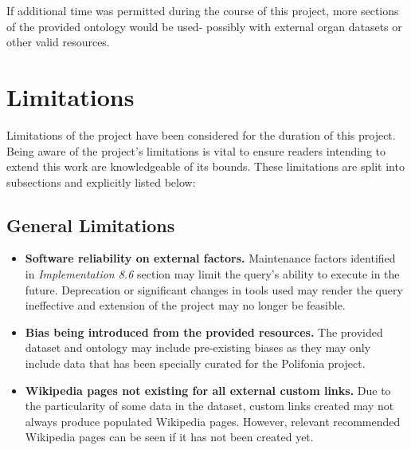 If additional time was permitted during the course of this project, more sections of the provided ontology would be used- possibly with external organ datasets or other valid resources. 

\section{Limitations}
\hspace{0.5cm} Limitations of the project have been considered for the duration of this project. Being aware of the project's limitations is vital to ensure readers intending to extend this work are knowledgeable of its bounds. These limitations are split into subsections and explicitly listed below:

\subsection{General Limitations}
\begin{itemize}
    \item \textbf{Software reliability on external factors.} Maintenance factors identified in \textit{Implementation 8.6} section may limit the query's ability to execute in the future. Deprecation or significant changes in tools used may render the query ineffective and extension of the project may no longer be feasible. 
    \item \textbf{Bias being introduced from the provided resources.} The provided dataset and ontology may include pre-existing biases as they may only include data that has been specially curated for the Polifonia project. 
    \item \textbf{Wikipedia pages not existing for all external custom links.} Due to the particularity of some data in the dataset, custom links created may not always produce populated Wikipedia pages. However, relevant recommended Wikipedia pages can be seen if it has not been created yet.  
\end{itemize}

